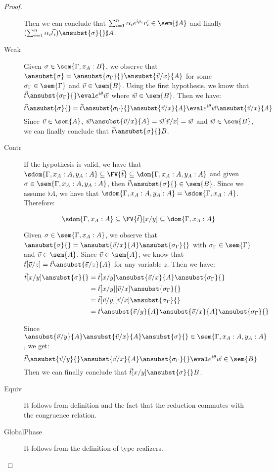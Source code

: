 \begin{proof}
\begin{description}
    Then we can conclude that $\sum_{i=1}^{n}\alpha_i e^{i\rho_i}\vec{v_i}\in\sem{\sharp A}$ and finally $(\sum_{i=1}^{n}\alpha_i\vec{t_i})\ansubst{\sigma}{}\real\sharp A$.

    \item[Weak] Given $\sigma\in\sem{\Gamma,x_A:B}$, we observe that $\ansubst{\sigma}=\ansubst{\sigma_\Gamma}{}\ansubst{\vec{v}/x}{A}$ for some $\sigma_\Gamma\in\sem{\Gamma}$ and $\vec{v}\in\sem{B}$. Using the first hypothesis, we know that $\vec{t}\ansubst{\sigma_\Gamma}{}\eval e^{i\theta}\vec{w}$ where $\vec{w}\in\sem{B}$. Then we have:
    \[
    \vec{t}\ansubst{\sigma}{}=\vec{t}\ansubst{\sigma_\Gamma}{}\ansubst{\vec{v}/x}{A}\eval e^{i\theta}\vec{w}\ansubst{\vec{v}/x}{A}
    \]
    Since $\vec{v}\in\sem{A}$, $\vec{w}\ansubst{\vec{v}/x}{A}=\vec{w}[\vec{v}/x]=\vec{w}$ and $\vec{w}\in\sem{B}$, we can finally conclude that $\vec{t}\ansubst{\sigma}{}\real B$.

    \item[Contr] If the hypothesis is valid, we have that $\sdom{\Gamma, x_A:A, y_A:A}\subseteq\FV{\vec{t}}\subseteq\dom{\Gamma,x_A:A, y_A:A}$ and given $\sigma\in\sem{\Gamma,x_A:A, y_A:A}$, then $\vec{t}\ansubst{\sigma}{}\in\sem{B}$. Since we assume $\flat A$, we have that $\sdom{\Gamma,x_A:A, y_A:A}=\sdom{\Gamma,x_A:A}$. Therefore:
    
    \[
    \sdom{\Gamma,x_A:A}\subseteq\FV{\vec{t}}[x/y]\subseteq\dom{\Gamma,x_A:A}
    \]

    Given $\sigma\in\sem{\Gamma,x_A:A}$, we observe that $\ansubst{\sigma}{}=\ansubst{\vec{v}/x}{A}\ansubst{\sigma_\Gamma}{}$ with $\sigma_\Gamma\in\sem{\Gamma}$ and $\vec{v}\in\sem{A}$. Since $\vec{v}\in\sem{A}$, we know that $\vec{t}[\vec v/z] =\vec{t}\ansubst{\vec{v}/z}{A}$ for any variable $z$. Then we have:
    \begin{align*}
        \vec{t}[x/y]\ansubst{\sigma}{} &= \vec{t}[x/y]\ansubst{\vec{v}/x}{A}\ansubst{\sigma_\Gamma}{}\\
        &=\vec{t}[x/y][\vec{v}/x]\ansubst{\sigma_\Gamma}{}\\
        &=\vec{t}[\vec{v}/y][\vec{v}/x]\ansubst{\sigma_\Gamma}{}\\
        &=\vec{t}\ansubst{\vec{v}/y}{A}\ansubst{\vec{v}/x}{A}\ansubst{\sigma_\Gamma}{}    
    \end{align*}
    
    Since $\ansubst{\vec{v}/y}{A}\ansubst{\vec{v}/x}{A}\ansubst{\sigma}{}\in\sem{\Gamma,x_A:A,y_A:A}$, we get:
    \[\vec{t}\ansubst{\vec{v}/y}{}\ansubst{\vec{v}/x}{A}\ansubst{\sigma_\Gamma}{}\eval e^{i\theta}\vec{w}\in\sem{B}\]
    Then we can finally conclude that $\vec{t}[x/y]\ansubst{\sigma}{}\real B$.

    \item[Equiv] It follows from definition and the fact that the reduction commutes with the congruence relation.
    
    \item[GlobalPhase] It follows from the definition of type realizers.
    \end{description}
\end{proof}


